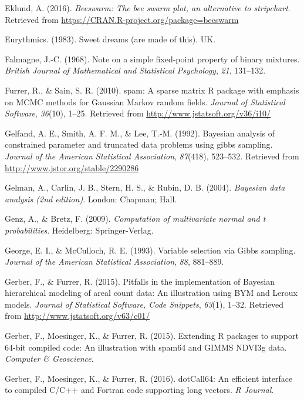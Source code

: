 \documentclass[english,man]{apa6}
\theoremstyle{definition}
\theoremstyle{definition}
\theoremstyle{remark}
\begin{document}
\hypertarget{ref-R-beeswarm}{}
Eklund, A. (2016). \emph{Beeswarm: The bee swarm plot, an alternative to
stripchart}. Retrieved from
\url{https://CRAN.R-project.org/package=beeswarm}

\hypertarget{ref-Eurythmics:1983}{}
Eurythmics. (1983). Sweet dreams (are made of this). UK.

\hypertarget{ref-Falmagne:1968}{}
Falmagne, J.-C. (1968). Note on a simple fixed-point property of binary
mixtures. \emph{British Journal of Mathematical and Statistical
Psychology}, \emph{21}, 131--132.

\hypertarget{ref-R-spam_a}{}
Furrer, R., \& Sain, S. R. (2010). spam: A sparse matrix R package with
emphasis on MCMC methods for Gaussian Markov random fields.
\emph{Journal of Statistical Software}, \emph{36}(10), 1--25. Retrieved
from \url{http://www.jstatsoft.org/v36/i10/}

\hypertarget{ref-Gelfand:etal:1992}{}
Gelfand, A. E., Smith, A. F. M., \& Lee, T.-M. (1992). Bayesian analysis
of constrained parameter and truncated data problems using gibbs
sampling. \emph{Journal of the American Statistical Association},
\emph{87}(418), 523--532. Retrieved from
\url{http://www.jstor.org/stable/2290286}

\hypertarget{ref-Gelman:etal:2004}{}
Gelman, A., Carlin, J. B., Stern, H. S., \& Rubin, D. B. (2004).
\emph{Bayesian data analysis (2nd edition)}. London: Chapman; Hall.

\hypertarget{ref-R-mvtnorm}{}
Genz, A., \& Bretz, F. (2009). \emph{Computation of multivariate normal
and t probabilities}. Heidelberg: Springer-Verlag.

\hypertarget{ref-George:McCulloch:1993}{}
George, E. I., \& McCulloch, R. E. (1993). Variable selection via Gibbs
sampling. \emph{Journal of the American Statistical Association},
\emph{88}, 881--889.

\hypertarget{ref-R-spam_b}{}
Gerber, F., \& Furrer, R. (2015). Pitfalls in the implementation of
Bayesian hierarchical modeling of areal count data: An illustration
using BYM and Leroux models. \emph{Journal of Statistical Software, Code
Snippets}, \emph{63}(1), 1--32. Retrieved from
\url{http://www.jstatsoft.org/v63/c01/}

\hypertarget{ref-R-dotCall64_b}{}
Gerber, F., Moesinger, K., \& Furrer, R. (2015). Extending R packages to
support 64-bit compiled code: An illustration with spam64 and GIMMS
NDVI3g data. \emph{Computer \& Geoscience}.

\hypertarget{ref-R-dotCall64_a}{}
Gerber, F., Moesinger, K., \& Furrer, R. (2016). dotCall64: An efficient
interface to compiled C/C++ and Fortran code supporting long vectors.
\emph{R Journal}.
\end{document}
